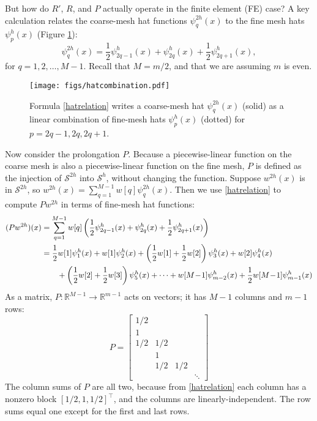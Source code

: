\documentclass[letterpaper,final,12pt,reqno]{amsart}
\newcommand{\RR}{\mathbb{R}}
\begin{document}
But how do $R'$, $R$, and $P$ actually operate in the finite element (FE) case?  A key calculation relates the coarse-mesh hat functions $\psi_q^{2h}(x)$ to the fine mesh hats $\psi_p^h(x)$ (Figure \ref{fig:hatcombination}):
\begin{equation}
  \psi_q^{2h}(x) = \frac{1}{2} \psi_{2q-1}^h(x) + \psi_{2q}^h(x) + \frac{1}{2} \psi_{2q+1}^h(x), \label{hatrelation}
\end{equation}
for $q=1,2,\dots,M-1$.  Recall that $M=m/2$, and that we are assuming $m$ is even.

\begin{figure}
\texttt{[image: figs/hatcombination.pdf]}
\caption{Formula \eqref{hatrelation} writes a coarse-mesh hat $\psi_q^{2h}(x)$ (solid) as a linear combination of fine-mesh hats $\psi_p^h(x)$ (dotted) for $p=2q-1,2q,2q+1$.}
\label{fig:hatcombination}
\end{figure}

Now consider the prolongation $P$.  Because a piecewise-linear function on the coarse mesh is also a piecewise-linear function on the fine mesh, $P$ is defined as the injection of $\mathcal{S}^{2h}$ into $\mathcal{S}^h$, without changing the function.  Suppose $w^{2h}(x)$ is in $\mathcal{S}^{2h}$, so $w^{2h}(x) = \sum_{q=1}^{M-1} w[q] \psi_q^{2h}(x)$.  Then we use \eqref{hatrelation} to compute $P w^{2h}$ in terms of fine-mesh hat functions:
\begin{align}
(P w^{2h})(x) &= \sum_{q=1}^{M-1} w[q] \left(\frac{1}{2} \psi_{2q-1}^h(x) + \psi_{2q}^h(x) + \frac{1}{2} \psi_{2q+1}^h(x)\right) \label{pformula} \\
              &= \frac{1}{2} w[1] \psi_1^h(x) + w[1] \psi_2^h(x) + \left(\frac{1}{2} w[1] + \frac{1}{2} w[2]\right) \psi_3^h(x) + w[2] \psi_4^h(x) \notag \\
              &\qquad + \left(\frac{1}{2} w[2] + \frac{1}{2} w[3]\right) \psi_5^h(x) + \dots + w[M\!-\!1] \psi_{m-2}^h(x) + \frac{1}{2} w[M\!-\!1] \psi_{m-1}^h(x) \notag
\end{align}
As a matrix, $P:\RR^{M-1} \to \RR^{m-1}$ acts on vectors; it has $M-1$ columns and $m-1$ rows:
\begin{equation}
P = \begin{bmatrix}
1/2 & & & \\
1 & & & \\
1/2 & 1/2 & & \\
 & 1 & & \\
 & 1/2 & 1/2 & \\
 & & & \ddots
\end{bmatrix} \label{pmatrix}
\end{equation}
The column sums of $P$ are all two, because from \eqref{hatrelation} each column has a nonzero block $[1/2,1,1/2]^\top$, and the columns are linearly-independent.  The row sums equal one except for the first and last rows.
\end{document}
